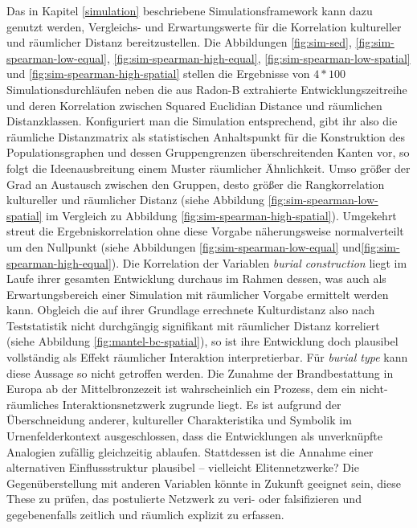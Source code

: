 \documentclass[openany,twoside,twocolumn]{book}
\begin{document}
Das in Kapitel \ref{simulation} beschriebene Simulationsframework kann dazu genutzt werden, Vergleichs- und Erwartungswerte für die Korrelation kultureller und räumlicher Distanz bereitzustellen. Die Abbildungen \ref{fig:sim-sed}, \ref{fig:sim-spearman-low-equal}, \ref{fig:sim-spearman-high-equal}, \ref{fig:sim-spearman-low-spatial} und \ref{fig:sim-spearman-high-spatial} stellen die Ergebnisse von \(4 * 100\) Simulationsdurchläufen neben die aus Radon-B extrahierte Entwicklungszeitreihe und deren Korrelation zwischen Squared Euclidian Distance und räumlichen Distanzklassen. Konfiguriert man die Simulation entsprechend, gibt ihr also die räumliche Distanzmatrix als statistischen Anhaltspunkt für die Konstruktion des Populationsgraphen und dessen Gruppengrenzen überschreitenden Kanten vor, so folgt die Ideenausbreitung einem Muster räumlicher Ähnlichkeit. Umso größer der Grad an Austausch zwischen den Gruppen, desto größer die Rangkorrelation kultureller und räumlicher Distanz (siehe Abbildung \ref{fig:sim-spearman-low-spatial} im Vergleich zu Abbildung \ref{fig:sim-spearman-high-spatial}). Umgekehrt streut die Ergebniskorrelation ohne diese Vorgabe näherungsweise normalverteilt um den Nullpunkt (siehe Abbildungen \ref{fig:sim-spearman-low-equal} und\ref{fig:sim-spearman-high-equal}). Die Korrelation der Variablen \emph{burial construction} liegt im Laufe ihrer gesamten Entwicklung durchaus im Rahmen dessen, was auch als Erwartungsbereich einer Simulation mit räumlicher Vorgabe ermittelt werden kann. Obgleich die auf ihrer Grundlage errechnete Kulturdistanz also nach Teststatistik nicht durchgängig signifikant mit räumlicher Distanz korreliert (siehe Abbildung \ref{fig:mantel-bc-spatial}), so ist ihre Entwicklung doch plausibel vollständig als Effekt räumlicher Interaktion interpretierbar. Für \emph{burial type} kann diese Aussage so nicht getroffen werden. Die Zunahme der Brandbestattung in Europa ab der Mittelbronzezeit ist wahrscheinlich ein Prozess, dem ein nicht-räumliches Interaktionsnetzwerk zugrunde liegt. Es ist aufgrund der Überschneidung anderer, kultureller Charakteristika und Symbolik im Urnenfelderkontext ausgeschlossen, dass die Entwicklungen als unverknüpfte Analogien zufällig gleichzeitig ablaufen. Stattdessen ist die Annahme einer alternativen Einflussstruktur plausibel -- vielleicht Elitennetzwerke? Die Gegenüberstellung mit anderen Variablen könnte in Zukunft geeignet sein, diese These zu prüfen, das postulierte Netzwerk zu veri- oder falsifizieren und gegebenenfalls zeitlich und räumlich explizit zu erfassen.
\end{document}
